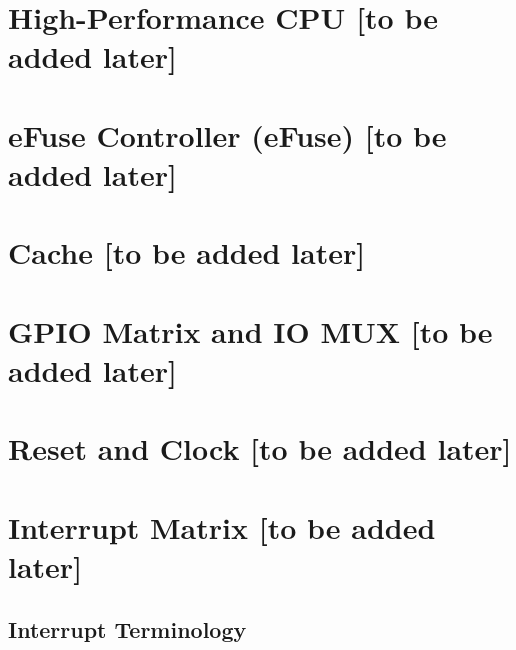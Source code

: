 \documentclass{article}
\begin{document}







\section{High-Performance CPU [to be added later]}\label{mod:riscvcpu}
\section{eFuse Controller (eFuse) [to be added later]}\label{mod:efuse}
\section{Cache [to be added later]}\label{mod:cache}
\section{GPIO Matrix and IO MUX [to be added later]}\label{mod:iomuxgpio}
\section{Reset and Clock [to be added later]}\label{mod:resclk}
\section{Interrupt Matrix [to be added later]}\label{mod:intmtrx}
    \subsection{Interrupt Terminology}\label{sec:intmtx-int-terminology}
\end{document}

